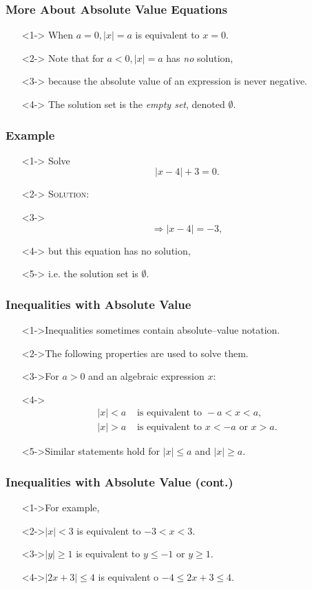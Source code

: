 \documentclass[handout]{beamer}
\begin{document}
\begin{frame}
  \frametitle{More About Absolute Value Equations}
  \begin{enumerate}
    \item[]<1-> When $a=0, |x|=a$ is equivalent to $x=0$.
    \item[]<2-> Note that for $a<0, |x|=a$ has \emph{no} solution,
    \item[]<3-> because the absolute value of an expression is never negative.
    \item[]<4-> The solution set is the \emph{empty set}, denoted $\emptyset$.
  \end{enumerate}
\end{frame}

\begin{frame}
  \frametitle{Example}
  \begin{enumerate}
    \item[]<1-> Solve \[ |x-4|+3=0. \]
    \item[]<2-> \textsc{Solution:}
    \item[]<3-> \[ \Rightarrow |x-4|=-3,\]
    \item[]<4-> but this equation has no solution,
    \item[]<5-> i.e. the solution set is $\emptyset$.
  \end{enumerate}
\end{frame}

\begin{frame}
  \frametitle{Inequalities with Absolute Value}
  \begin{enumerate}
    \item[]<1->Inequalities sometimes contain absolute--value notation.
    \item[]<2->The following properties are used to solve them.
    \item[]<3->For $a>0$ and an algebraic expression $x$:
    \item[]<4->
    \begin{align*}
      |x|<a & \text{ is equivalent to } -a<x<a, \\
      |x|>a & \text{ is equivalent to } x<-a \text{ or }x>a.
    \end{align*}
    \item[]<5->Similar statements hold for $|x| \leq a$ and $|x| \geq a$.
  \end{enumerate}
\end{frame}

\begin{frame}
  \frametitle{Inequalities with Absolute Value (cont.)}
  \begin{enumerate}
    \item[]<1->For example,
    \item[]<2->$|x|<3$ is equivalent to $-3<x<3$.
    \item[]<3->$|y| \geq 1$ is equivalent to $y \leq -1$ or $y \geq 1$.
    \item[]<4->$|2x+3| \leq 4$ is equivalent o $-4 \leq 2x+3 \leq 4$.
  \end{enumerate}
\end{frame}
\end{document}
